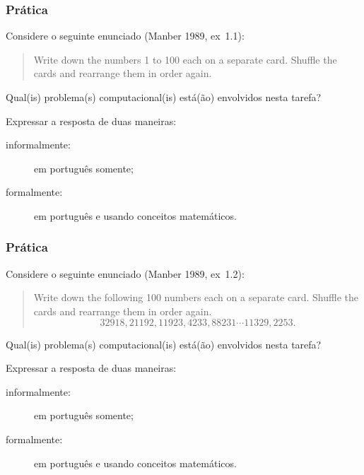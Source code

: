 \documentclass{beamer}
\begin{document}
\begin{frame}
  \frametitle{Prática}

  Considere o seguinte enunciado (Manber 1989, ex~1.1):

  \begin{quote}
    Write down the numbers 1 to 100 each on a separate card. Shuffle the cards
    and rearrange them in order again.
  \end{quote}
  
  Qual(is) problema(s) computacional(is) está(ão) envolvidos nesta tarefa? 

  Expressar a resposta de duas maneiras:
  \begin{description}
  \item[informalmente:] em português somente;
  \item[formalmente:] em português e usando conceitos matemáticos.
  \end{description}
  
\end{frame}

\begin{frame}
  \frametitle{Prática}

  Considere o seguinte enunciado (Manber 1989, ex~1.2):

  \begin{quote}
    Write down the following 100 numbers each on a separate card. Shuffle the cards
    and rearrange them in order again.
    \[
    32918, 21192 , 11923 , 4233 , 88231 \cdots 11329 , 2253.
    \]
  \end{quote}
  
  Qual(is) problema(s) computacional(is) está(ão) envolvidos nesta tarefa? 

  Expressar a resposta de duas maneiras:
  \begin{description}
  \item[informalmente:] em português somente;
  \item[formalmente:] em português e usando conceitos matemáticos.
  \end{description}
  
\end{frame}
\end{document}

